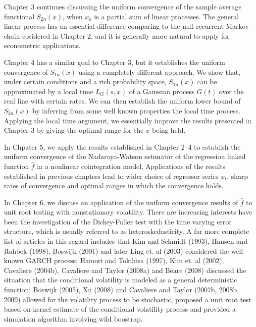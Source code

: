 Chapter 3 continues discussing the uniform convergence of the sample average functional $S_{2n}(x)$, when $x_k$ is a partial sum of linear processes. The general linear process has an essential difference comparing to the null recurrent Markov chain cosidered in Chapter 2, and it is generally more natural to apply for econometric applications.


Chapter 4 has a similar goal to Chapter 3, but it establishes the uniform convergence of $S_{1n}(x)$ using a completely different approach. We show that, under certain conditions and a rich probability space, $S_{1n}(x)$ can be approximated by a local time $L_G(s, x)$ of a Gaussian process $G(t)$ over the real line with certain rates.  We can then establish the uniform lower bound of $S_{2n}(x)$ by inferring from some well known properties the local time process. Applying the local time argument, we essentially improve the results presented in Chapter 3 by giving the optimal range for the $x$ being held.

In Chpater 5, we apply the results established in Chapter 2--4 to establish the uniform convergence of the Nadaraya-Watson estimator of the regression linked function $\hat{f}$ in a nonlinear cointegration model. Applications of the results established in previous chapters lead to wider choice of regressor series $x_t$, sharp rates of convergence and optimal ranges in which the convergence holds. 

In Chapter 6, we discuss an application of the uniform convergence results of $\hat{f}$ to unit root testing with nonstationary volatility. There are increasing interests have been the investigation of the Dickey-Fuller test with the time varying error structure, which is  usually referred to as heteroskedasticity. A far more complete list of articles in this regard includes that
Kim and Schmidt (1993), Hansen and Rahbek (1998),  Boswijk (2001) and later Ling et. al (2003) considered   the well known GARCH process; Hamori and Tokihisa (1997),  Kim et. al (2002),  Cavaliere (2004b), Cavaliere and Taylor (2008a) and Beare (2008) discussed  the situation that the conditional volatility is modeled as a general deterministic function;
 Boswijk (2005),  Xu (2008) and  Cavaliere and Taylor (2007b, 2008b, 2009) allowed for the volatility process to be stochastic, proposed a unit root test based on kernel estimate of the conditional volatility process and provided a simulation algorithm involving wild boostrap.


